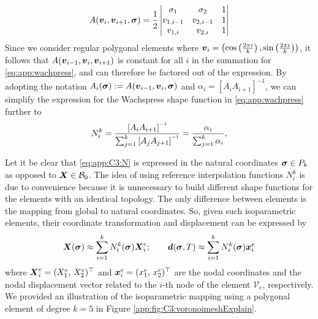 %
\begin{equation}
A({\boldsymbol{v}}_{i}, {\boldsymbol{v}}_{i+1}, \boldsymbol{\sigma}) = \frac{1}{2} \left| \begin{matrix}
\sigma_1 & \sigma_2 & 1 \\
v_{1,i-1} & v_{2,i-1} & 1 \\
v_{1,i} & v_{2,i} & 1 \\
\end{matrix} \right|
\end{equation}
%
Since we consider regular polygonal elements where ${\boldsymbol{v}}_i = \left(\cos\left(\frac{2\pi i}{k}\right), \sin\left(\frac{2\pi i}{k}\right)\right)$, it follows that $A({\boldsymbol{v}}_{i-1}, {\boldsymbol{v}}_i, {\boldsymbol{v}}_{i+1})$ is constant for all $i$ in the summation for \eqref{eq:app:wachpress}, and can therefore be factored out of the expression. By adopting the notation $A_i(\boldsymbol{\sigma}) := A({\boldsymbol{v}}_{i-1}, {\boldsymbol{v}}_i, \boldsymbol{\sigma})$ and $\alpha_i = \left[A_i A_{i+1}\right]^{-1}$, we can simplify the expression for the Wachspress shape function in \eqref{eq:app:wachpress} further to
%
\begin{equation}
N^k_i= \frac{\left[A_{i} A_{i+1}\right]\inv}{\sum_{j=1}^k \left[A_{j} A_{j+1}\right]\inv} = \frac{\alpha_i }{\sum_{j=1}^k \alpha_i},
\label{eq:app:C3:N}
\end{equation}
%
\begin{rmk}
Let it be clear that \eqref{eq:app:C3:N} is expressed in the natural coordinates $\boldsymbol{\sigma} \in P_k$ as opposed to ${\boldsymbol{X}} \in \mathcal{B}_0$. The idea of using reference interpolation functions $N^k_i$ is due to convenience because it is unnecessary to build different shape functions for the elements with an identical topology. The only difference between elements is the mapping from global to natural coordinates. So, given such isoparametric elements, their coordinate transformation and displacement can be expressed by
%
\begin{equation*}
{\boldsymbol{X}}(\boldsymbol{\sigma}) \approx \sum^{k}_{i=1} N_{i}^k(\boldsymbol{\sigma}) {\boldsymbol{X}}_i^e;  \quad \quad
{\boldsymbol{d}}(\boldsymbol{\sigma},T) \approx \sum^{k}_{i=1} N_{i}^k(\boldsymbol{\sigma}) {\boldsymbol{x}}_i^e 
\end{equation*}
%  
where ${\boldsymbol{X}}_{i}^{e} = (X^e_1,\, X^e_2)^\top$ and ${\boldsymbol{x}}_{i}^{e} = (x^e_1,\, x^e_2)^\top$ are the nodal coordinates and the nodal displacement vector related to the $i$-th node of the element $\mathcal{V}_e$, respectively. We provided an illustration of the isoparametric mapping using a polygonal element of degree $k=5$ in Figure \ref{app:fig:C3:voronoimeshExplain}.
\end{rmk}

